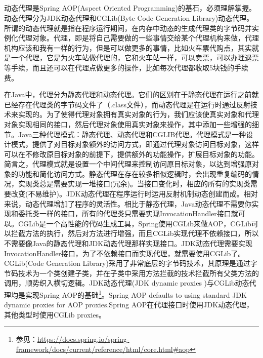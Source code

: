 \documentclass[../../../interview-questions.tex]{subfiles}
\begin{document}
\subsection{\color{red}{Java的静态代理(Static Proxy)和动态代理(Dynamic Proxy)有什么差别？}}

动态代理是Spring AOP(Aspect Oriented Programming)的基石，必须理解掌握。动态代理分为JDK动态代理和CGLib(Byte Code Generation Library)动态代理。所谓的动态代理就是指在程序运行期间，在内存中动态的生成代理类的字节码并实例化代理对象。代理，即是将自己需要做的一些事情交给某个代理机构来做，代理机构应该和我有一样的行为，但是可以做更多的事情，比如火车票代购点，其实就是一个代理，它是为火车站做代理的，它和火车站一样，可以卖票，可以办理退票等手续，而且还可以在代理点做更多的操作，比如每次代理都收取5块钱的手续费。

在Java中，代理分为静态代理和动态代理。它们的区别在于静态代理在运行之前就已经存在代理类的字节码文件了（.class文件），而动态代理是在运行时通过反射技术来实现的。为了使得代理对象拥有真实对象的行为，我们应该使真实对象和代理对象实现相同的接口，然后代理对象使用真实对象来操作，其中添加一些增强的细节。Java三种代理模式：静态代理、动态代理和CGLIB代理。代理模式是一种设计模式，提供了对目标对象额外的访问方式，即通过代理对象访问目标对象，这样可以在不修改原目标对象的前提下，提供额外的功能操作，扩展目标对象的功能。简言之，代理模式就是设置一个中间代理来控制访问原目标对象，以达到增强原对象的功能和简化访问方式。静态代理在存在较多相似逻辑时，会出现重复编码的情况，实现类总是需要实现一堆接口(冗余)。当接口变化时，相应的所有的实现类需要改变(不易维护)。JDK动态代理在程序运行时运用反射机制动态创建而成。相对来说，动态代理增加了程序的灵活性。相比于静态代理，Java动态代理不需要你实现和委托类一样的接口，所有的代理类只需要实现InvocationHandler接口就可以。CGLib是一个高性能的代码生成工具，Spring使用CGLib来做AOP，CGLib可以拦截方法的执行，然后对方法进行增强，而且CGLib实现代理不依赖接口，所以不需要像Java的静态代理和JDK动态代理那样实现接口。JDK动态代理需要实现InvocationHandler接口，为了不依赖接口而实现代理，就需要使用CGLib了。CGLib(Code Generation Library)采用了非常底层的字节码技术，其原理是通过字节码技术为一个类创建子类，并在子类中采用方法拦截的技术拦截所有父类方法的调用，顺势织入横切逻辑。JDK动态代理(JDK dynamic proxies )与CGLib动态代理均是实现Spring AOP的基础\footnote{参见：\url{https://docs.spring.io/spring-framework/docs/current/reference/html/core.html\#aop}}。Spring AOP defaults to using standard JDK dynamic proxies for AOP proxies.Spring AOP在代理接口时使用JDK动态代理，其他类型时使用CGLib proxies。
\end{document}
